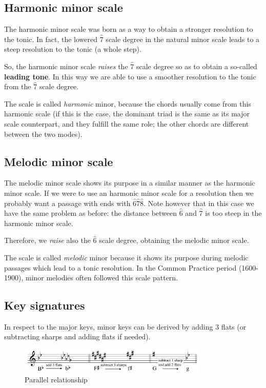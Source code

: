 \subsection{Harmonic minor scale}
The harmonic minor scale was born as a way to obtain a stronger resolution to the tonic. In fact, the lowered $\hat 7$ scale degree in the natural minor scale leads to a steep resolution to the tonic (a whole step).

So, the harmonic minor scale \emph{raises} the $\hat 7$ scale degree so as to obtain a so-called \textbf{leading tone}. In this way we are able to use a smoother resolution to the tonic from the $\hat 7$ scale degree.

The scale is called \emph{harmonic} minor, because the chords usually come from this harmonic scale (if this is the case, the dominant triad is the same as its major scale counterpart, and they fulfill the same role; the other chords are different between the two modes).

\subsection{Melodic minor scale}
The melodic minor scale shows its purpose in a similar manner as the harmonic minor scale. If we were to use an harmonic minor scale for a resolution then we probably want a passage with ends with $\hat 6 \hat 7 \hat 8$. Note however that in this case we have the same problem as before: the distance between $\hat 6$ and $\hat 7$ is too steep in the harmonic minor scale.

Therefore, we \emph{raise} also the $\hat 6$ scale degree, obtaining the melodic minor scale.

The scale is called \emph{melodic} minor because it shows its purpose during melodic passages which lead to a tonic resolution. In the Common Practice period (1600-1900), minor melodies often followed this scale pattern.

\subsection{Key signatures}
In respect to the major keys, minor keys can be derived by adding 3 flats (or subtracting sharps and adding flats if needed).

\begin{figure}
    \begin{center}
        \includegraphics[width=0.8\textwidth]{img/parallel}
        \caption{Parallel relationship}
    \end{center}
\end{figure}


